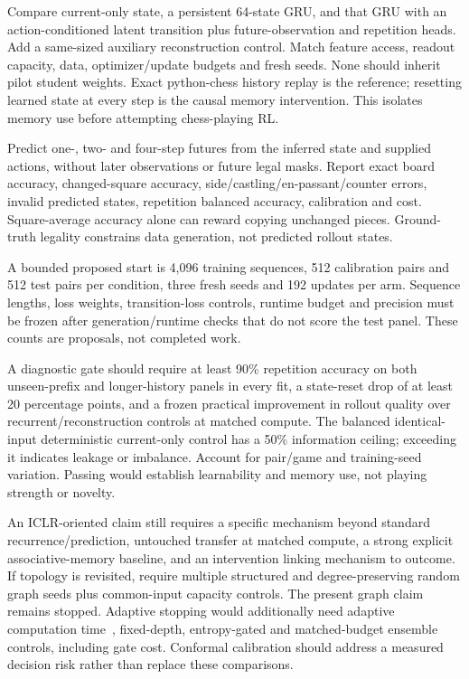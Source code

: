 \documentclass[10pt]{article}
\begin{document}
Compare current-only state, a persistent 64-state GRU, and that GRU with an
action-conditioned latent transition plus future-observation and repetition
heads. Add a same-sized auxiliary reconstruction control. Match feature access,
readout capacity, data, optimizer/update budgets and fresh seeds. None should
inherit pilot student weights. Exact python-chess history replay is the reference;
resetting learned state at every step is the causal memory intervention.
This isolates memory use before attempting chess-playing RL.

Predict one-, two- and four-step futures from the inferred state and supplied
actions, without later observations or future legal masks. Report exact board
accuracy, changed-square accuracy, side/castling/en-passant/counter errors,
invalid predicted states, repetition balanced accuracy, calibration and cost.
Square-average accuracy alone can reward copying unchanged pieces.
Ground-truth legality constrains data generation, not predicted rollout states.

A bounded proposed start is 4,096 training sequences, 512 calibration pairs and
512 test pairs per condition, three fresh seeds and 192 updates per arm.
Sequence lengths, loss weights, transition-loss controls, runtime budget and
precision must be frozen after generation/runtime checks that do not score the
test panel. These counts are proposals, not completed work.

A diagnostic gate should require at least 90\% repetition accuracy on both
unseen-prefix and longer-history panels in every fit, a state-reset drop of at
least 20 percentage points, and a frozen practical improvement in rollout
quality over recurrent/reconstruction controls at matched compute. The balanced
identical-input deterministic current-only control has a 50\% information ceiling; exceeding
it indicates leakage or imbalance. Account for pair/game and training-seed
variation. Passing would establish learnability and memory use, not playing
strength or novelty.

An ICLR-oriented claim still requires a specific mechanism beyond standard
recurrence/prediction, untouched transfer at matched compute, a strong explicit
associative-memory baseline, and an intervention linking mechanism to outcome.
If topology is revisited, require multiple structured and degree-preserving
random graph seeds plus common-input capacity controls. The present graph claim
remains stopped. Adaptive stopping would additionally need adaptive computation
time~\cite{graves2016}, fixed-depth, entropy-gated and matched-budget ensemble
controls, including gate cost. Conformal calibration should address a measured
decision risk rather than replace these comparisons.
\end{document}
